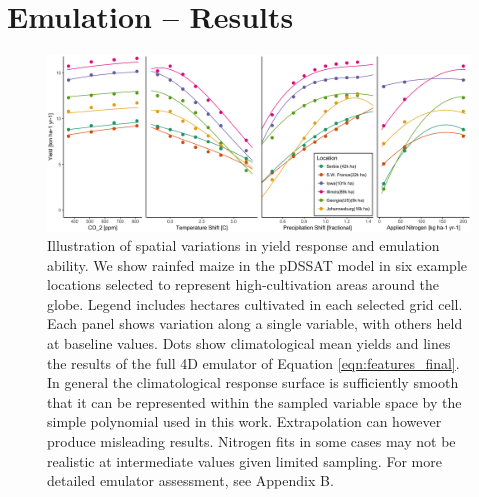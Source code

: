 \documentclass[esd, manuscript]{copernicus} %
\begin{document}
\section{Emulation -- Results}
\label{S:5}

\begin{figure}[ht]
\centering
    \includegraphics[width=16cm]{figures/regression_areas.png}
    \caption{Illustration of spatial variations in yield response and emulation ability. We show rainfed maize in the pDSSAT model in six example locations selected to represent high-cultivation areas around the globe. Legend includes hectares cultivated in each selected grid cell. Each panel shows variation along a single variable, with others held at baseline values. Dots show climatological mean yields and lines the results of the full 4D emulator of Equation \ref{eqn:features_final}. In general the climatological response surface is sufficiently smooth that it can be represented within the sampled variable space by the simple polynomial used in this work. Extrapolation can however produce misleading results. Nitrogen fits in some cases may not be realistic at intermediate values given limited sampling. For more detailed emulator assessment, see Appendix B.}
   \label{fig:regression}
\end{figure}
\end{document}
